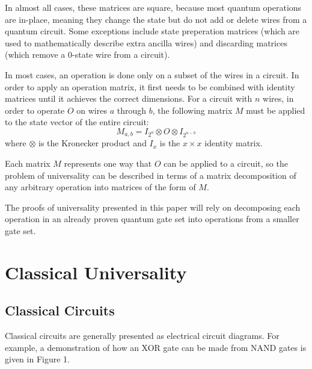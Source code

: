 \documentclass[12pt]{article}
\begin{document}
In almost all cases, these matrices are square, because most quantum operations are in-place, meaning they change the state but do not add or delete wires from a quantum circuit. Some exceptions include state preperation matrices (which are used to mathematically describe extra ancilla wires) and discarding matrices (which remove a 0-state wire from a circuit).

In most cases, an operation is done only on a subset of the wires in a circuit. In order to apply an operation matrix, it first needs to be combined with identity matrices until it achieves the correct dimensions. For a circuit with $n$ wires, in order to operate $O$ on wires $a$ through $b$, the following matrix $M$ must be applied to the state vector of the entire circuit:
$$
M_{a, b} = I_{2^a} \otimes O \otimes I_{2^{n - b}}
$$
where $\otimes$ is the Kronecker product and $I_x$ is the $x \times x$ identity matrix.

Each matrix $M$ represents one way that $O$ can be applied to a circuit, so the problem of universality can be described in terms of a matrix decomposition of any arbitrary operation into matrices of the form of $M$.

The proofs of universality presented in this paper will rely on decomposing each operation in an already proven quantum gate set into operations from a smaller gate set.

\section{Classical Universality}
\subsection{Classical Circuits}
Classical circuits are generally presented as electrical circuit diagrams. For example, a demonstration of how an XOR gate can be made from NAND gates is given in Figure 1.
\end{document}
